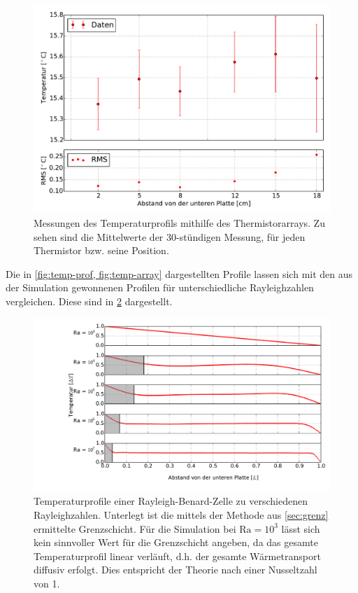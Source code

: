 \begin{figure}
	\centering
	\includegraphics[width=\textwidth]{plots/T_korr_profile.pdf}
	\caption{Messungen des Temperaturprofils mithilfe des Thermistorarrays. Zu sehen sind die Mittelwerte der 30-stündigen Messung, für jeden Thermistor bzw. seine Position.}\label{fig:temp-array}
\end{figure}
Die in \cref{fig:temp-prof, fig:temp-array} dargestellten Profile lassen sich mit den aus der Simulation gewonnenen Profilen für unterschiedliche Rayleighzahlen vergleichen.
Diese sind in \cref{fig:sim-temp} dargestellt.
\\
\begin{figure}
	\centering
	\includegraphics[width=\textwidth]{plots/T_sim_Profile.pdf}
	\caption{Temperaturprofile einer Rayleigh-Benard-Zelle zu verschiedenen Rayleighzahlen. Unterlegt ist die mittels der Methode aus \cref{sec:grenz} ermittelte Grenzschicht. Für die Simulation bei $\text{Ra}=10^3$ lässt sich kein sinnvoller Wert für die Grenzschicht angeben, da das gesamte Temperaturprofil linear verläuft, d.h. der gesamte Wärmetransport diffusiv erfolgt. Dies entspricht der Theorie nach einer Nusseltzahl von 1.}\label{fig:sim-temp}
\end{figure}
